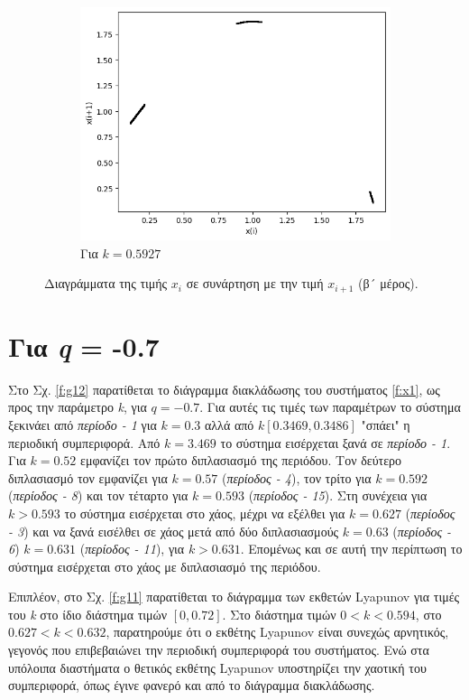\begin{figure}[ht]
\begin{subfigure}[b]{0.4\textwidth}
		\includegraphics[width=\textwidth]{LateX images/graphs q05/g11}
		\caption{Για $k=0.5927$}
		\label{f:k36}
	\end{subfigure}
	\hfill
	\caption{Διαγράμματα της τιμής \(x_i\) σε συνάρτηση με την τιμή \(x_{i+1}\) (β´ μέρος).}		
\end{figure}

\clearpage

\section{Για \emph{q} = -0.7}

Στο Σχ. \ref{f:g12} παρατίθεται το διάγραμμα διακλάδωσης του συστήματος \ref{f:x1}, ως προς την παράμετρο \emph{k}, για $q =- 0.7$. Για αυτές τις τιμές των παραμέτρων το σύστημα ξεκινάει από \emph{περίοδο - 1} για $k=0.3$ αλλά από $k[0.3469,0.3486]$ "σπάει" η περιοδική συμπεριφορά. Από $k=3.469$ το σύστημα εισέρχεται ξανά σε \emph{περίοδο - 1}. Για  $k = 0.52$ εμφανίζει τον πρώτο διπλασιασμό της περιόδου. Τον δεύτερο διπλασιασμό τον εμφανίζει για $k=0.57$  (\emph{περίοδος - 4}), τον τρίτο για $k=0.592$ (\emph{περίοδος - 8}) και τον τέταρτο για $k=0.593$ (\emph{περίοδος - 15}). Στη συνέχεια για $k>0.593$ το σύστημα εισέρχεται στο χάος, μέχρι να εξέλθει  για $k=0.627$ (\emph{περίοδος -   3}) και να ξανά εισέλθει σε χάος μετά από δύο διπλασιασμούς $k=0.63$  (\emph{περίοδος - 6}) $k=0.631$ (\emph{περίοδος -   11}), για $k>0.631$.
Επομένως και σε αυτή την περίπτωση το σύστημα εισέρχεται στο χάος με διπλασιασμό της περιόδου. 

Επιπλέον, στο Σχ. \ref{f:g11} παρατίθεται το διάγραμμα των εκθετών Lyapunov για τιμές του \emph{k} στο ίδιο διάστημα τιμών $[0, 0.72]$. Στο διάστημα τιμών $0<k<0.594$, στο $0.627<k<0.632$, παρατηρούμε ότι ο εκθέτης Lyapunov είναι συνεχώς αρνητικός, γεγονός που επιβεβαιώνει την περιοδική συμπεριφορά του συστήματος. Ενώ στα υπόλοιπα διαστήματα ο θετικός εκθέτης Lyapunov υποστηρίζει την χαοτική του συμπεριφορά, όπως έγινε φανερό και από το διάγραμμα διακλάδωσης.

